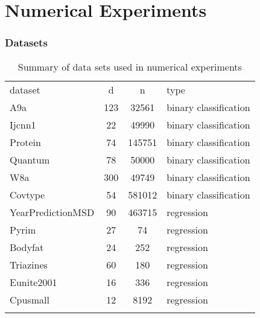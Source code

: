 \documentclass{beamer}
\begin{document}
\section{Numerical Experiments}
\begin{frame}
	\frametitle{\bf Datasets} 
\begin{center}
	\begin{table}
		\centering
		\caption{Summary of data sets used in numerical experiments}
		\label{tab:1}       %
		\begin{tabular}{l c c l}
			\hline\noalign{\smallskip}
			dataset & d & n & type \\
			\noalign{\smallskip}\hline\noalign{\smallskip}
			A9a & 123 & 32561&binary classification  \\
			Ijcnn1 & 22 & 49990 &binary classification  \\
			Protein & 74 & 145751&binary classification  \\
			Quantum & 78 & 50000&binary classification  \\
			W8a & 300 & 49749&binary classification  \\
			Covtype & 54 & 581012 &binary classification  \\
			YearPredictionMSD & 90 & 463715 &regression \\
			Pyrim & 27 & 74 &regression \\
			Bodyfat & 24 & 252&regression  \\
			Triazines & 60 & 180&regression  \\
			Eunite2001 & 16 & 336&regression  \\
			Cpusmall & 12 & 8192&regression  \\
			\noalign{\smallskip}\hline
		\end{tabular}
	\end{table}
\end{center}
\end{frame}
\end{document}
